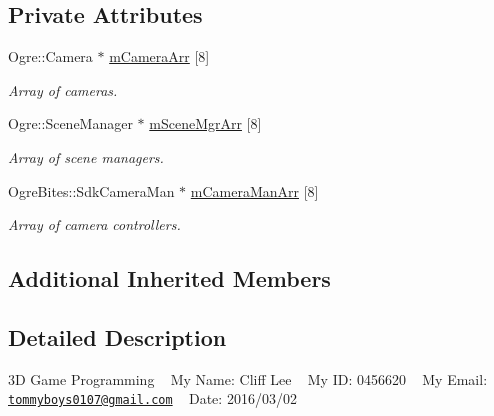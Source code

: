 \subsection*{Private Attributes}
\begin{DoxyCompactItemize}
\item 
Ogre\+::\+Camera $\ast$ \hyperlink{class_basic_tutorial__00_af8d457d912286a98c0975c52d4faf910}{m\+Camera\+Arr} \mbox{[}8\mbox{]}\hypertarget{class_basic_tutorial__00_af8d457d912286a98c0975c52d4faf910}{}\label{class_basic_tutorial__00_af8d457d912286a98c0975c52d4faf910}

\begin{DoxyCompactList}\small\item\em Array of cameras. \end{DoxyCompactList}\item 
Ogre\+::\+Scene\+Manager $\ast$ \hyperlink{class_basic_tutorial__00_a603779b6087698c57b7989e16d8a9b93}{m\+Scene\+Mgr\+Arr} \mbox{[}8\mbox{]}\hypertarget{class_basic_tutorial__00_a603779b6087698c57b7989e16d8a9b93}{}\label{class_basic_tutorial__00_a603779b6087698c57b7989e16d8a9b93}

\begin{DoxyCompactList}\small\item\em Array of scene managers. \end{DoxyCompactList}\item 
Ogre\+Bites\+::\+Sdk\+Camera\+Man $\ast$ \hyperlink{class_basic_tutorial__00_a700c07f924c71e9fa1885a46f599d934}{m\+Camera\+Man\+Arr} \mbox{[}8\mbox{]}\hypertarget{class_basic_tutorial__00_a700c07f924c71e9fa1885a46f599d934}{}\label{class_basic_tutorial__00_a700c07f924c71e9fa1885a46f599d934}

\begin{DoxyCompactList}\small\item\em Array of camera controllers. \end{DoxyCompactList}\end{DoxyCompactItemize}
\subsection*{Additional Inherited Members}


\subsection{Detailed Description}
3D Game Programming ~\newline
My Name\+: Cliff Lee ~\newline
My ID\+: 0456620 ~\newline
My Email\+: \href{mailto:tommyboys0107@gmail.com}{\tt tommyboys0107@gmail.\+com} ~\newline
 Date\+: 2016/03/02 

